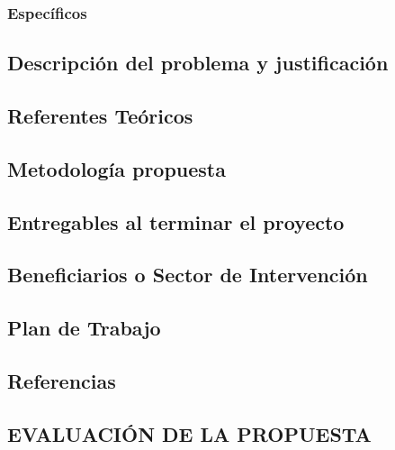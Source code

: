 \documentclass[english, a4paper, 12pt, twoside]{article}
\numberwithin{equation}{section} %
\begin{document}
        \subsubsection{Específicos}
            
    \subsection{Descripción del problema y justificación}
        
    \subsection{Referentes Teóricos}
        
    \subsection{Metodología propuesta}
        
    \subsection{Entregables al terminar el proyecto}
        
    \subsection{Beneficiarios o Sector de Intervención}
        
    \subsection{Plan de Trabajo}
        
    \subsection{Referencias}
        
     \subsection{EVALUACIÓN DE LA PROPUESTA}
        
    
    






\end{document}
